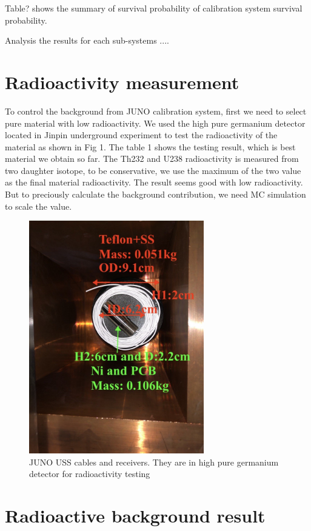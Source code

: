 \documentclass[review,number,sort&compress]{elsarticle}
\begin{document}
Table? shows the summary of survival probability of calibration system survival probability.


Analysis the results for each sub-systems ....

\section{Radioactivity measurement}
To control the background from JUNO calibration system, first we need to select pure material with low radioactivity. 
We used the high pure germanium detector located in Jinpin underground experiment to test the radioactivity of the material as shown in Fig 1.
The table 1 shows the testing result, which is best material we obtain so far. The Th232 and U238 radioactivity is measured from two daughter isotope, to be conservative, we use the maximum of the two value as the final material radioactivity. The result seems good with low radioactivity. But to preciously calculate the background contribution, we need MC simulation to scale the value.

\begin{figure}[h]
	\centering
	\includegraphics[width=3in]{USS_Cable_PCB_Ni.png}
	\caption{JUNO USS cables and receivers. They are in high pure germanium detector for radioactivity testing}
	\label{USS_Cable_PCB}
\end{figure}


\section{Radioactive background result}
\end{document}
